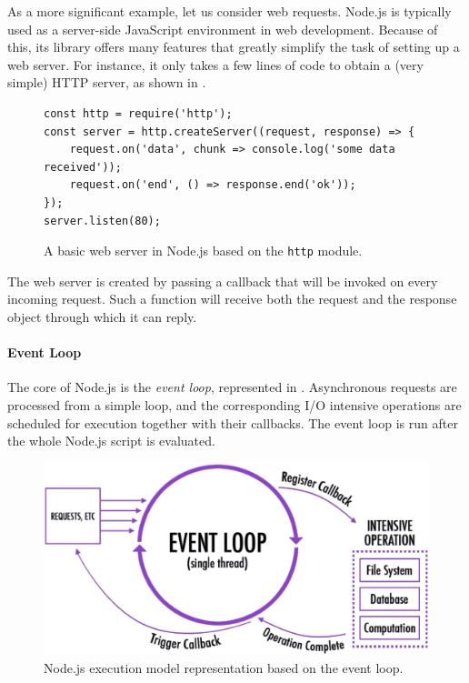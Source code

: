 As a more significant example, let us consider web requests.
Node.js is typically used as a server-side JavaScript environment in web development.
Because of this, its library offers many features that greatly simplify the task of setting up a web server.
For instance, it only takes a few lines of code to obtain a (very simple) HTTP server, as shown in .

\begin{figure}[h]
\begin{lstlisting}
const http = require('http');
const server = http.createServer((request, response) => {
	request.on('data', chunk => console.log('some data received'));
	request.on('end', () => response.end('ok'));
});
server.listen(80);
\end{lstlisting}
\caption{A basic web server in Node.js based on the \lstinline{http} module.}
\label{lst:http}
\end{figure}
The web server is created by passing a callback that will be invoked on every incoming request.
Such a function will receive both the request and the response object through which it can reply.

\paragraph{Event Loop}
The core of Node.js is the \emph{event loop}, represented in .
Asynchronous requests are processed from a simple loop, and the corresponding I/O intensive operations are scheduled for execution together with their callbacks.
The event loop is run after the whole Node.js script is evaluated.

\begin{figure}[h]
	\centering
	\includegraphics[width=.5\textwidth]{fig/event-loop}
	\caption{Node.js execution model representation based on the event loop.}
	\label{fig:eventloop}
\end{figure}


